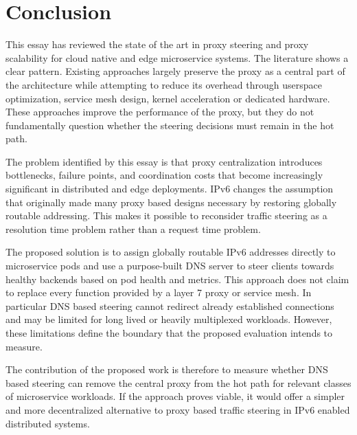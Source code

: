 \documentclass[a4paper,11pt]{article}
\begin{document}
\section{Conclusion}

This essay has reviewed the state of the art in proxy steering and proxy scalability for cloud native and edge microservice systems.
The literature shows a clear pattern. Existing approaches largely preserve the proxy as a central part of the architecture while attempting
to reduce its overhead through userspace optimization, service mesh design, kernel acceleration or dedicated hardware.
These approaches improve the performance of the proxy, but they do not fundamentally question whether the steering decisions must remain in the hot path.

The problem identified by this essay is that proxy centralization introduces bottlenecks, failure points, and coordination costs that become increasingly significant in
distributed and edge deployments. IPv6 changes the assumption that originally made many proxy based designs necessary by restoring globally
routable addressing. This makes it possible to reconsider traffic steering as a resolution time problem rather than a request time problem.

The proposed solution is to assign globally routable IPv6 addresses directly to microservice pods and use a purpose-built DNS server to steer clients
towards healthy backends based on pod health and metrics. This approach does not claim to replace every function provided by a layer 7 proxy or service mesh.
In particular DNS based steering cannot redirect already established connections and may be limited for long lived or heavily multiplexed workloads.
However, these limitations define the boundary that the proposed evaluation intends to measure.

The contribution of the proposed work is therefore to measure whether DNS based steering can remove the central proxy from the hot path for relevant classes of microservice workloads.
If the approach proves viable, it would offer a simpler and more decentralized alternative to proxy based traffic steering in IPv6 enabled distributed systems.

\newpage
\printbibliography
\end{document}
